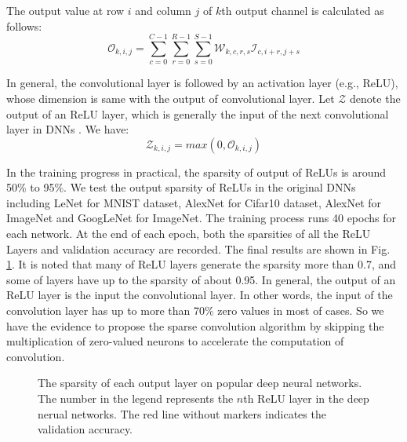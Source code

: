 \documentclass{article}
\begin{document}
The output value at row $i$ and column $j$ of $k$th output channel is calculated as follows:
\begin{equation}
\label{equation:conv}
\mathcal{O}_{k,i,j}=\sum_{c=0}^{C-1}\sum_{r=0}^{R-1}\sum_{s=0}^{S-1}\mathcal{W}_{k,c,r,s}\mathcal{I}_{c,i+r,j+s}
\end{equation}

In general, the convolutional layer is followed by an activation layer (e.g., ReLU), whose dimension is same with the output of convolutional layer. Let $\mathcal{Z}$ denote the output of an ReLU layer, which is generally the input of the next convolutional layer in DNNs \cite{szegedy2015going,he2016deep}. We have:
\begin{equation}
\label{equation:relu}
\mathcal{Z}_{k,i,j}=max(0, \mathcal{O}_{k,i,j})
\end{equation}

In the training progress in practical, the sparsity of output of ReLUs is around 50\% to 95\%. We test the output sparsity of ReLUs in the original DNNs including LeNet \cite{lecun1998gradient} for MNIST dataset, AlexNet \cite{krizhevsky2012imagenet} for Cifar10 dataset, AlexNet \cite{krizhevsky2012imagenet} for ImageNet and GoogLeNet \cite{szegedy2015going} for ImageNet. The training process runs 40 epochs for each network. At the end of each epoch, both the sparsities of all the ReLU Layers and validation accuracy are recorded. The final results are shown in Fig. \ref{fig:sparcnn}. It is noted that many of ReLU layers generate the sparsity more than 0.7, and some of layers have up to the sparsity of about 0.95. In general, the output of an ReLU layer is the input the convolutional layer. In other words, the input of the convolution layer has up to more than 70\% zero values in most of cases. So we have the evidence to propose the sparse convolution algorithm by skipping the multiplication of zero-valued neurons to accelerate the computation of convolution.

\begin{figure}[!htbp]
  \centering
\caption{The sparsity of each output layer on popular deep neural networks. The number in the legend represents the $n$th ReLU layer in the deep nerual networks. The red line without markers indicates the validation accuracy.}
\label{fig:sparcnn}
\end{figure}
\end{document}
